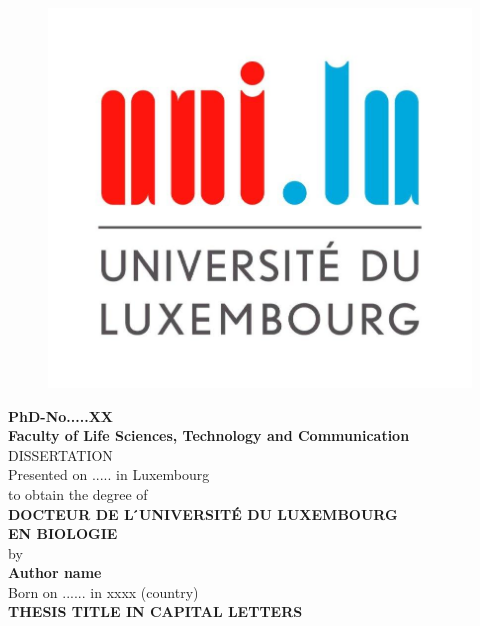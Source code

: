 \documentclass[11pt,a4paper]{report}
\begin{document}

\thispagestyle{empty}
\begin{figure}
\includegraphics[width=0.3\columnwidth]{logo_uni.jpg}
\centering
\end{figure}

\begin {center}
\textbf{\footnotesize{PhD-No.....XX}}\\
\vspace{0.4cm}
\textbf{\footnotesize{Faculty of Life Sciences, Technology and Communication}}\\
\vspace{2.2cm}
\large{DISSERTATION}\\
\vspace{0.3cm}
Presented on ..... in Luxembourg\\
\vspace{0.3cm}
to obtain the degree of\\
\vspace{0.3cm}
\textbf{\Large{DOCTEUR DE L ́UNIVERSITÉ DU LUXEMBOURG}}\\
\vspace{0.5cm}
\textbf{\Large{EN BIOLOGIE}}\\
\vspace{1.6cm}
by\\
\vspace{0.3cm}
\textbf{Author name}\\
\vspace{0.3cm}
Born on ...... in xxxx (country)\\
\vspace{1.6cm}
\textbf{\Large{THESIS TITLE IN CAPITAL LETTERS}}


\end {center}
\end{document}
